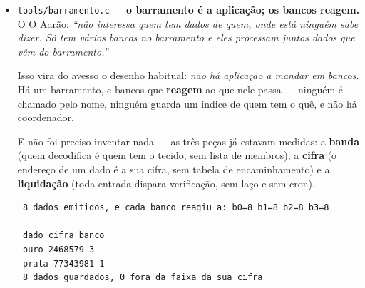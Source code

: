 \documentclass[11pt]{article}
\newcommand{\code}[1]{\texttt{\small #1}}
\theoremstyle{plain}
\theoremstyle{remark}
\begin{document}
\begin{itemize}
\begin{verbatim}
 a frase em PT (7,3)
 no tradutor (10,3)
 chegada em EN (13,3)
 e direto PT->EN (13,3) 361 frases, 0 que diferem
\end{verbatim}

\textbf{É isso que um tradutor tem de ser: um meio que se atravessa, e não um que acrescenta.} O
desvio dele soma-se ao seguinte e o total é o mesmo. E \emph{volta}: $\varphi_{-t}$ desfaz
$\varphi_t$, e ir e voltar dá a identidade nas $361$ frases --- traduzir e destraduzir é o chicote,
um estica o que o outro contrai.

\textbf{E o significado atravessa}: os três meios têm o mesmo $\Delta$, que é a lei da refração e
não escolha anterior. A classe racional muda de idioma; o \emph{irracional} --- o significado --- fica.
Era o que o \code{traducao.c} já tinha provado: a rotação é determinada pelos pontos fixos, e os
pontos fixos são o sentido. E por isso dois idiomas de $\Delta$ diferente \textbf{não se relaiam}
--- não é falta de tradutor, é que não há travessia entre índices diferentes.

E a roda fecha: $t(\text{PT}\to\text{TR}) + t(\text{TR}\to\text{EN}) + t(\text{EN}\to\text{PT}) = 0$,
e as $361$ frases regressam. \emph{Com dois isso era trivial; com três é uma condição} --- e é ela
que faz do relay um relay e não um telefone estragado.

\item \code{tools/barramento.c} --- \textbf{o barramento é a aplicação; os bancos reagem.} O
O Aarão: \emph{``não interessa quem tem dados de quem, onde está ninguém sabe dizer. Só tem vários
bancos no barramento e eles processam juntos dados que vêm do barramento.''}

Isso vira do avesso o desenho habitual: \emph{não há aplicação a mandar em bancos}. Há um
barramento, e bancos que \textbf{reagem} ao que nele passa --- ninguém é chamado pelo nome, ninguém
guarda um índice de quem tem o quê, e não há coordenador.

E não foi preciso inventar nada --- as três peças já estavam medidas: a \textbf{banda} (quem
decodifica é quem tem o tecido, sem lista de membros), a \textbf{cifra} (o endereço de um dado é a
sua cifra, sem tabela de encaminhamento) e a \textbf{liquidação} (toda entrada dispara verificação,
sem laço e sem cron).

\begin{verbatim}
 8 dados emitidos, e cada banco reagiu a: b0=8 b1=8 b2=8 b3=8

 dado cifra banco
 ouro 2468579 3
 prata 77343981 1
 8 dados guardados, 0 fora da faixa da sua cifra


\end{verbatim}
\end{itemize}
\end{document}
